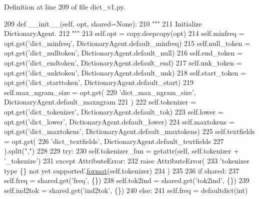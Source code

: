 Definition at line 209 of file dict\+\_\+v1.\+py.


\begin{DoxyCode}
209     \textcolor{keyword}{def }\_\_init\_\_(self, opt, shared=None):
210         \textcolor{stringliteral}{"""}
211 \textcolor{stringliteral}{        Initialize DictionaryAgent.}
212 \textcolor{stringliteral}{        """}
213         self.opt = copy.deepcopy(opt)
214         self.minfreq = opt.get(\textcolor{stringliteral}{'dict\_minfreq'}, DictionaryAgent.default\_minfreq)
215         self.null\_token = opt.get(\textcolor{stringliteral}{'dict\_nulltoken'}, DictionaryAgent.default\_null)
216         self.end\_token = opt.get(\textcolor{stringliteral}{'dict\_endtoken'}, DictionaryAgent.default\_end)
217         self.unk\_token = opt.get(\textcolor{stringliteral}{'dict\_unktoken'}, DictionaryAgent.default\_unk)
218         self.start\_token = opt.get(\textcolor{stringliteral}{'dict\_starttoken'}, DictionaryAgent.default\_start)
219         self.max\_ngram\_size = opt.get(
220             \textcolor{stringliteral}{'dict\_max\_ngram\_size'}, DictionaryAgent.default\_maxngram
221         )
222         self.tokenizer = opt.get(\textcolor{stringliteral}{'dict\_tokenizer'}, DictionaryAgent.default\_tok)
223         self.lower = opt.get(\textcolor{stringliteral}{'dict\_lower'}, DictionaryAgent.default\_lower)
224         self.maxtokens = opt.get(\textcolor{stringliteral}{'dict\_maxtokens'}, DictionaryAgent.default\_maxtokens)
225         self.textfields = opt.get(
226             \textcolor{stringliteral}{'dict\_textfields'}, DictionaryAgent.default\_textfields
227         ).split(\textcolor{stringliteral}{","})
228 
229         \textcolor{keywordflow}{try}:
230             self.tokenizer\_fun = getattr(self, self.tokenizer + \textcolor{stringliteral}{'\_tokenize'})
231         \textcolor{keywordflow}{except} AttributeError:
232             \textcolor{keywordflow}{raise} AttributeError(
233                 \textcolor{stringliteral}{'tokenizer type \{\} not yet supported'}.\hyperlink{namespaceparlai_1_1chat__service_1_1services_1_1messenger_1_1shared__utils_a32e2e2022b824fbaf80c747160b52a76}{format}(self.tokenizer)
234             )
235 
236         \textcolor{keywordflow}{if} shared:
237             self.freq = shared.get(\textcolor{stringliteral}{'freq'}, \{\})
238             self.tok2ind = shared.get(\textcolor{stringliteral}{'tok2ind'}, \{\})
239             self.ind2tok = shared.get(\textcolor{stringliteral}{'ind2tok'}, \{\})
240         \textcolor{keywordflow}{else}:
241             self.freq = defaultdict(int)

\end{DoxyCode}
